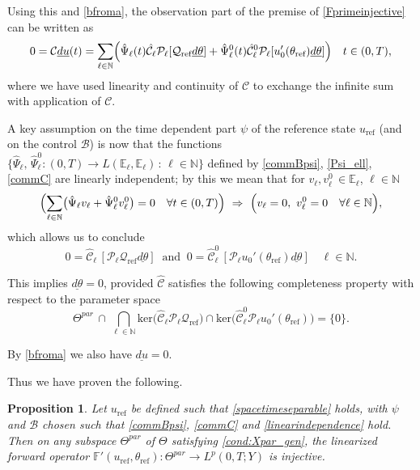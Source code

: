 \documentclass[12pt]{article}
\newtheorem{proposition}[theorem]{Proposition}
\newcommand\uld[1]{\underline{d#1}}
\newcommand\BB{\mathcal{B}}
\newcommand\Proj{\mathcal{P}}
\newcommand\ellnew{\ell}
\newcommand\hrefprime{\mathcal{Q}_{\text{ref}}}
\begin{document}
Using this and \eqref{bfroma}, the observation part of the premise of \eqref{Fprimeinjective} can be written as 
\[
0=\mathcal{C}\uld{u}(t)= 
\sum_{\ell\in\mathbb{N}} \Bigl(\hat{\Psi}_\ell(t) \hat{\mathcal{C}}_\ellnew \Proj_\ell[\hrefprime\uld{\theta}] + \hat{\Psi}_\ell^0(t) \hat{\mathcal{C}}^0_\ellnew \Proj_\ell[u_0'(\theta_{\text{ref}})\uld{\theta}]\Bigr)
\quad t\in(0,T),
\]
where we have used linearity and continuity of $\mathcal{C}$ to exchange the infinite sum with application of $\mathcal{C}$.

A key assumption on the time dependent part $\psi$ of the reference state $u_{\text{ref}}$ (and on the control $\BB$) is now that 
the functions 
$\{\hat{\Psi}_\ell,\,\hat{\Psi}_\ell^0:(0,T)\to L(\mathbb{E}_\ell,\mathbb{E}_\ell)\, :\, \ell\in\mathbb{N}\}$
defined by \eqref{commBpsi}, \eqref{Psi_ell}, \eqref{commC} are linearly independent; by this we mean that for $v_\ell,v_\ell^0\,\in \mathbb{E}_\ell$, $\ell\in\mathbb{N}$
\begin{equation}\label{linearindependence}
\Bigl(\sum_{\ell\in\mathbb{N}}\bigl(\hat{\Psi}_\ell v_\ell+\hat{\Psi}_\ell^0 v_\ell^0\bigr)=0\quad \forall t\in(0,T)\Bigr) \ \Rightarrow \
\Bigl( v_\ell=0, \ v_\ell^0=0 \quad \forall \ell\in\mathbb{N}\Bigr),
\end{equation} 
which allows us to conclude 
\begin{equation}\label{obs0}
0= \hat{\mathcal{C}}_\ellnew\, [\Proj_\ell \hrefprime\uld{\theta}]
\ \text{ and } \
0= \hat{\mathcal{C}}^0_\ellnew\, [\Proj_\ell u_0'(\theta_{\text{ref}})\uld{\theta}]
\quad \ell\in\mathbb{N}.
\end{equation}

This implies $\uld{\theta}=0$, provided $\hat{\mathcal{C}}$ satisfies the following completeness property with respect to the parameter space
\begin{equation}\label{cond:Xpar_gen}
\Theta^{par}\,\cap\,\bigcap_{\ell\in\mathbb{N}} 
\text{ker}\bigl(\hat{\mathcal{C}}_\ellnew \Proj_\ell \hrefprime\bigr)\cap 
\text{ker}\bigl(\hat{\mathcal{C}}^0_\ellnew \Proj_\ell u_0'(\theta_{\text{ref}})\bigr)
=\{0\}.
\end{equation}

By \eqref{bfroma} we also have $\uld{u}=0$.

Thus we have proven the following.
\begin{proposition}\label{prop:lin-uniqueness}
Let $u_{\text{ref}}$ be defined such that \eqref{spacetimeseparable} holds, with $\psi$ and $\BB$ chosen such that \eqref{commBpsi}, \eqref{commC} and \eqref{linearindependence} hold.
Then on any subspace $\Theta^{par}$ of $\Theta$ satisfying \eqref{cond:Xpar_gen}, the linearized forward operator $\mathbb{F}'(u_{\text{ref}},\theta_{\text{ref}}):\Theta^{par}\to L^p(0,T;Y)$ is injective.
\end{proposition}
\end{document}
